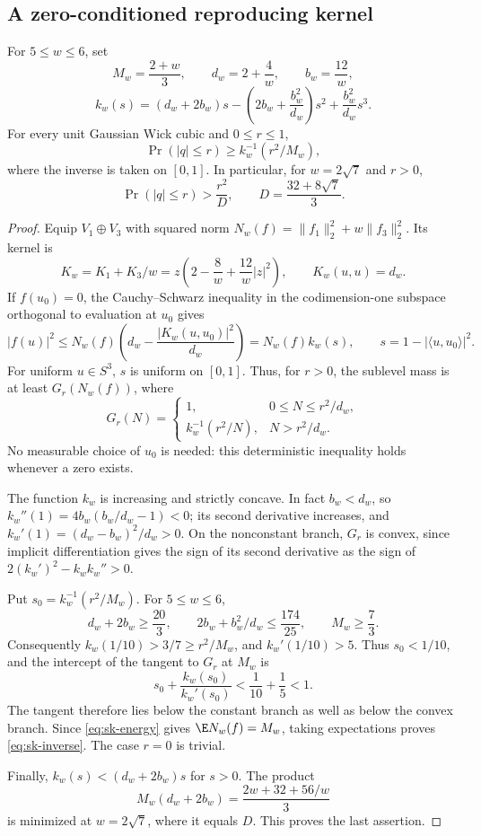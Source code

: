\subsection{A zero-conditioned reproducing kernel}
\begin{theorem}\label{thm:sk-inverse}
For $5\le w\le6$, set
\[
 M_w=\frac{2+w}{3},\qquad d_w=2+\frac4w,\qquad b_w=\frac{12}{w},
\]
\[
 k_w(s)=(d_w+2b_w)s-
 \left(2b_w+\frac{b_w^2}{d_w}\right)s^2+
 \frac{b_w^2}{d_w}s^3.
\]
For every unit Gaussian Wick cubic and $0\le r\le1$,
\begin{equation}\label{eq:sk-inverse}
 \Pr(|q|\le r)\ge k_w^{-1}(r^2/M_w),
\end{equation}
where the inverse is taken on $[0,1]$. In particular, for $w=2\sqrt7$ and $r>0$,
\[
 \Pr(|q|\le r)>\frac{r^2}{D},\qquad D=\frac{32+8\sqrt7}{3}.
\]
\end{theorem}
\begin{proof}
Equip $V_1\oplus V_3$ with squared norm $N_w(f)=\|f_1\|_2^2+w\|f_3\|_2^2$. Its kernel is
\[
 K_w=K_1+K_3/w=z\left(2-\frac8w+\frac{12}{w}|z|^2\right),\qquad K_w(u,u)=d_w.
\]
If $f(u_0)=0$, the Cauchy--Schwarz inequality in the codimension-one subspace orthogonal to evaluation at $u_0$ gives
\[
 |f(u)|^2\le N_w(f)\left(d_w-\frac{|K_w(u,u_0)|^2}{d_w}\right)
 =N_w(f)k_w(s),\qquad s=1-|\langle u,u_0\rangle|^2.
\]
For uniform $u\in S^3$, $s$ is uniform on $[0,1]$. Thus, for $r>0$, the sublevel mass is at least $G_r(N_w(f))$, where
\[
 G_r(N)=\begin{cases}
 1,&0\le N\le r^2/d_w,\\
 k_w^{-1}(r^2/N),&N>r^2/d_w.
 \end{cases}
\]
No measurable choice of $u_0$ is needed: this deterministic inequality holds whenever a zero exists.

The function $k_w$ is increasing and strictly concave. In fact $b_w<d_w$, so $k_w''(1)=4b_w(b_w/d_w-1)<0$; its second derivative increases, and $k_w'(1)=(d_w-b_w)^2/d_w>0$. On the nonconstant branch, $G_r$ is convex, since implicit differentiation gives the sign of its second derivative as the sign of $2(k_w')^2-k_w k_w''>0$.

Put $s_0=k_w^{-1}(r^2/M_w)$. For $5\le w\le6$,
\[
 d_w+2b_w\ge\frac{20}{3},\qquad
 2b_w+b_w^2/d_w\le\frac{174}{25},\qquad M_w\ge\frac73.
\]
Consequently $k_w(1/10)>3/7\ge r^2/M_w$, and $k_w'(1/10)>5$. Thus $s_0<1/10$, and the intercept of the tangent to $G_r$ at $M_w$ is
\[
 s_0+\frac{k_w(s_0)}{k_w'(s_0)}<\frac1{10}+\frac15<1.
\]
The tangent therefore lies below the constant branch as well as below the convex branch. Since \eqref{eq:sk-energy} gives $\E N_w(f)=M_w$, taking expectations proves \eqref{eq:sk-inverse}. The case $r=0$ is trivial.

Finally, $k_w(s)<(d_w+2b_w)s$ for $s>0$. The product
\[
 M_w(d_w+2b_w)=\frac{2w+32+56/w}{3}
\]
is minimized at $w=2\sqrt7$, where it equals $D$. This proves the last assertion.
\end{proof}

